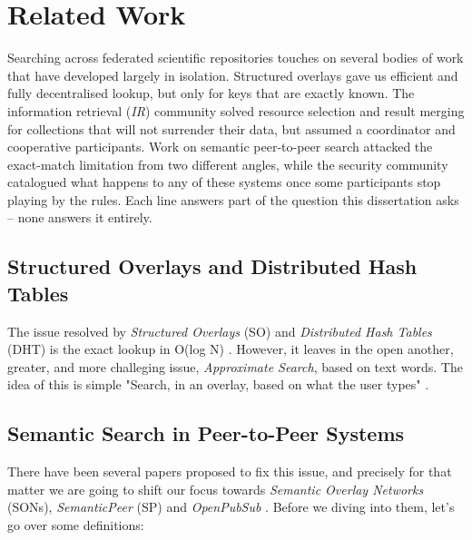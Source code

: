 
%

\chapter{Related Work}
\label{chap:related-work}
Searching across federated scientific repositories touches on several bodies of work that have developed largely in isolation. Structured overlays gave us efficient and fully decentralised lookup, but only for keys that are exactly known. The information retrieval (\textit{IR}) community solved resource selection and result merging for collections that will not surrender their data, but assumed a coordinator and cooperative participants. Work on semantic peer-to-peer search attacked the exact-match limitation from two different angles, while the security community catalogued what happens to any of these systems once some participants stop playing by the rules. Each line answers part of the question this dissertation asks – none answers it entirely.

\section{Structured Overlays and Distributed Hash Tables}
\label{sec:rw:dht}
The issue resolved by \textit{Structured Overlays} (SO) and \textit{Distributed Hash Tables} (DHT) is the exact lookup in O(log N) \cite{stoica2001chord,rowstron2001pastry,maymounkov2002kademlia}. However, it leaves in the open another, greater, and more challeging issue, \textit{Approximate Search}, based on text words. The idea of this is simple "Search, in an overlay, based on what the user types" \cite{crespo2005sons}.

\section{Semantic Search in Peer-to-Peer Systems}
\label{sec:rw:semantic-p2p}
There have been several papers proposed to fix this issue, and precisely for that matter we are going to shift our focus towards \textit{Semantic Overlay Networks} \cite{crespo2005sons} (SONs), \textit{SemanticPeer} \cite{zaarour2022semanticpeer} (SP) and \textit{OpenPubSub} \cite{zaarour2022openpubsub}. Before we diving into them, let's go over some definitions:

